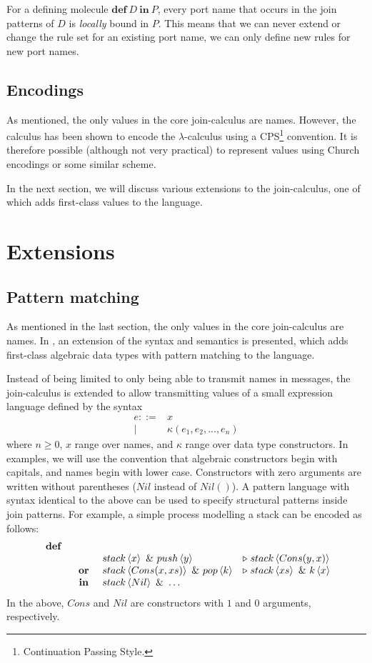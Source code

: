 For a defining molecule $\mathbf{def}~D~\mathbf{in}~P$, every port name that
occurs in the join patterns of $D$ is \emph{locally} bound in $P$. This means
that we can never extend or change the rule set for an existing port name, we
can only define new rules for new port names.

\subsection{Encodings}

As mentioned, the only values in the core join-calculus are names. However, the
calculus has been shown to encode the $\lambda$-calculus using a
CPS\footnote{Continuation Passing Style.} convention\cite{fournet1996reflexive}. It is
therefore possible (although not very practical) to represent values using
Church encodings or some similar scheme.

In the next section, we will discuss various extensions to the join-calculus,
one of which adds first-class values to the language.


\section{Extensions}

\subsection{Pattern matching}
As mentioned in the last section, the only values in the core join-calculus are
names. In \cite{MaMa2008AlgPat}, an extension of the syntax and semantics is
presented, which adds first-class algebraic data types with pattern matching to
the language.

Instead of being limited to only being able to transmit names in messages, the
join-calculus is extended to allow transmitting values of a small expression
language defined by the syntax
\begin{align*}
 e ::={}& x \\
  |\quad{}& \kappa(e_1, e_2, ..., e_n)
\end{align*}
where $n \geq 0$, $x$ range over names, and $\kappa$ range over data type
constructors. In examples, we will use the convention that algebraic
constructors begin with capitals, and names begin with lower case. Constructors
with zero arguments are written without parentheses ($Nil$ instead of $Nil()$).
A pattern language with syntax identical to the above can be used to specify
structural patterns inside join patterns. For example, a simple process
modelling a stack can be encoded as follows:
\begin{displaymath}
\begin{array}{rcll}
\defJ &&&
\\ & &   \atm stack<x> \andJ \atm push<y> &\toJ{} \atm stack<Cons(y,x)>
\\&\orJ&  \atm stack<Cons(x, xs)> \andJ \atm pop<k>& \toJ{} \atm stack<xs> \andJ \atm k<x>
\\&\inJ& \atm stack<Nil> \andJ \ldots
\end{array}
\end{displaymath}
In the above, $Cons$ and $Nil$ are constructors with $1$ and $0$ arguments,
respectively.

